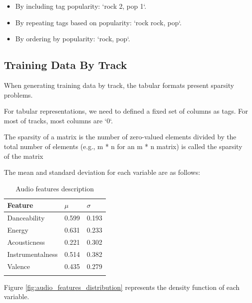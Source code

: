\documentclass[sn-mathphys]{sn-jnl}%
\theoremstyle{thmstyleone}%
\theoremstyle{thmstyletwo}%
\theoremstyle{thmstylethree}%
\begin{document}
\begin{itemize}
      \item By including tag popularity: `rock 2, pop 1`.
      \item By repeating tags based on popularity: `rock rock, pop`.
      \item By ordering by popularity: `rock, pop`.
\end{itemize}

\subsection{Training Data By Track}

When generating training data by track, the tabular formats present sparsity problems.

For tabular representations, we need to defined a fixed set of columns as tags.
For most of tracks, most columns are `0`.

The sparsity of a matrix is the number of zero-valued elements divided by the total number of elements
(e.g., m * n for an m * n matrix) is called the sparsity of the matrix

The mean and standard deviation for each variable are as follows:

\begin{table}[h]
      \begin{center}
      \begin{minipage}{\textwidth}
      \caption{Audio features description}\label{audio_features_stats}%
      \begin{tabular}{@{}lll@{}}
      \toprule
      Feature           & $\mu$ & $\sigma$ \\
      \midrule
      Danceability      & 0.599  & 0.193  \\
      Energy            & 0.631  & 0.233  \\
      Acousticness      & 0.221  & 0.302  \\
      Instrumentalness  & 0.514  & 0.382  \\
      Valence           & 0.435  & 0.279  \\
      \botrule
      \end{tabular}
      \end{minipage}
      \end{center}
\end{table}

Figure \ref{fig:audio_features_distribution} represents the density function of each variable.
\end{document}

